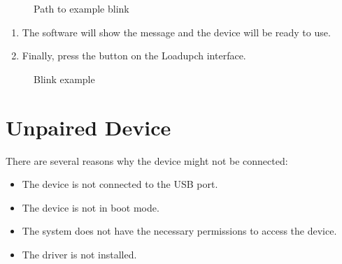 \documentclass[letterpaper,10pt,english]{sphinxmanual}
\begin{document}
\begin{figure}[htbp]
\centering
\capstart

\noindent{}
\caption{Path to example blink}\label{\detokenize{examples:id1}}\label{\detokenize{examples:figure-example}}\end{figure}
\begin{enumerate}
%
\setcounter{enumi}{5}
\item {} 
\sphinxAtStartPar
The software will show the message  and the device will be ready to use.

\item {} 
\sphinxAtStartPar
Finally, press the  button on the Loadupch interface.

\end{enumerate}

\begin{figure}[htbp]
\centering
\capstart

\noindent{}
\caption{Blink example}\label{\detokenize{examples:id2}}\label{\detokenize{examples:figure-flash-firmware}}\end{figure}

\sphinxstepscope


\chapter{Unpaired Device}
\label{\detokenize{error:unpaired-device}}\label{\detokenize{error::doc}}
\sphinxAtStartPar
There are several reasons why the device might not be connected:
\begin{itemize}
\item {} 
\sphinxAtStartPar
The device is not connected to the USB port.

\item {} 
\sphinxAtStartPar
The device is not in boot mode.

\item {} 
\sphinxAtStartPar
The system does not have the necessary permissions to access the device.

\item {} 
\sphinxAtStartPar
The driver is not installed.

\end{itemize}
\end{document}
